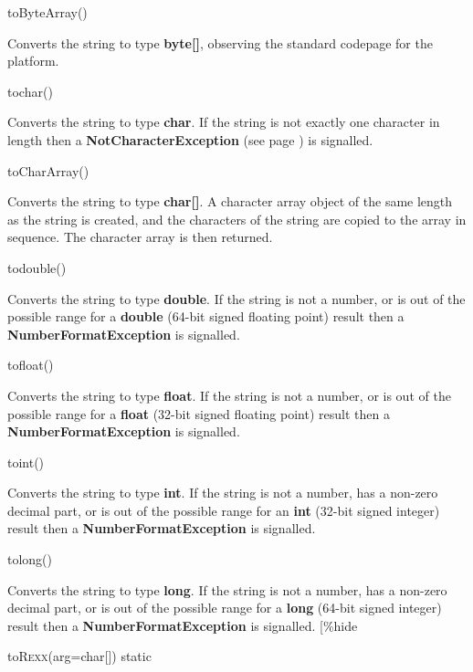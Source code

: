 \begin{description}
\item{toByteArray()}

 Converts the string to type
\textbf{byte[]}, observing the standard codepage for the platform. 

\item{tochar()}

Converts the string to type \textbf{char}.  If the string is
not exactly one character in length then
a  \textbf{NotCharacterException} (see page \pageref{refexpnce})  is signalled.
\item{toCharArray()}

Converts the string to type \textbf{char[]}.  A character array object
of the same length as the string is created, and the characters of the
string are copied to the array in sequence.  The character array is then
returned.
\item{todouble()}

Converts the string to type \textbf{double}.  If the string is
not a number, or is out of the possible range for a \textbf{double}
(64-bit signed floating point) result then a \textbf{NumberFormatException}
is signalled.
\item{tofloat()}

Converts the string to type \textbf{float}.  If the string is
not a number, or is out of the possible range for a \textbf{float}
(32-bit signed floating point) result then a \textbf{NumberFormatException}
is signalled.
\item{toint()}

Converts the string to type \textbf{int}.  If the string is
not a number, has a non-zero decimal part, or is out of the possible
range for an \textbf{int} (32-bit signed integer) result then
a \textbf{NumberFormatException} is signalled.
\item{tolong()}

Converts the string to type \textbf{long}.  If the string is
not a number, has a non-zero decimal part, or is out of the possible
range for a \textbf{long} (64-bit signed integer) result then
a \textbf{NumberFormatException} is signalled.
[\%hide
\item{toR\textsc{exx}(arg=char[]) static}


\end{description}
